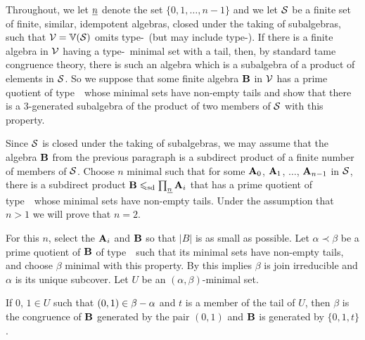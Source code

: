 \medskip

Throughout, we let $\underline{n}$ denote the set $\{0,1,\dots, n-1\}$ and 
we let $\mathcal{S}$ be a finite 
set of finite,
similar, idempotent algebras, closed under the taking of 
subalgebras, such that
$\mathcal{V} = \operatorname{\mathbb{V}}(\mathcal{S})$ omits type-\utyp\ (but may include type-\styp).
If there is a finite algebra in $\mathcal{V}$ having a type-\atyp\ minimal 
set with a tail, then, by standard tame congruence theory, there
is such an algebra which is a subalgebra of a product 
of elements in $\mathcal{S}$. 
So we suppose that some finite algebra
$\mathbf{B}$ in $\mathcal{V}$ has a prime quotient of type~\atyp\ whose 
minimal sets 
have non-empty
tails and show that there is a 3-generated 
subalgebra of the
product of two members of $\mathcal{S}$ with this property.

Since $\mathcal{S}$ is closed under the taking of subalgebras,
we may assume that the algebra $\mathbf{B}$ from the previous paragraph is a subdirect
product of a finite number of members of $\mathcal{S}$. Choose $n$ minimal such that for
some $\mathbf{A}_0$, $\mathbf{A}_1$, $\dots$, $\mathbf{A}_{n-1}$ in $\mathcal{S}$, there is a subdirect
product $\mathbf{B} \leqslant_{\mathrm{sd}} \prod_{\underline{n}} \mathbf{A}_i$
that has a prime quotient of type~\atyp\ whose minimal sets have
non-empty tails.
Under the assumption that $n > 1$ we will prove that $n = 2$.

For this $n$, select the $\mathbf{A}_i$ and $\mathbf{B}$ so that $|B|$ is as small as possible.
Let $\alpha \prec \beta$ be a prime quotient of $\mathbf{B}$ 
of type~\atyp\ such that its minimal sets have
non-empty tails, and choose $\beta$ minimal with this property.
By \cite[Lemma 6.2]{HM:1988} this implies $\beta$ is join 
irreducible and $\alpha$ is its unique subcover.
Let $U$ be an $(\alpha, \beta)$-minimal set. 


\begin{lemma}
\label{lem:fv_3-1}
If\/ $0$, $1 \in U$ such that $(0,1) \in \beta - \alpha$ and
$t$ is a member of the tail of $U$, then $\beta$ is the 
congruence of $\mathbf{B}$
generated by the pair $(0,1)$ and $\mathbf{B}$ is generated 
by $\{0, 1, t\}$.
\end{lemma}

